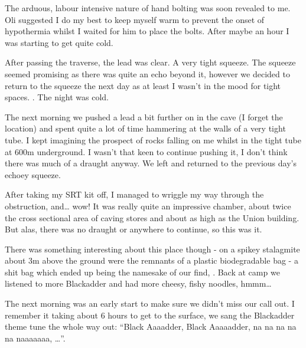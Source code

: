 The arduous, labour intensive nature of hand bolting was soon revealed to me. Oli suggested I do my best to keep myself warm to prevent the onset of hypothermia whilst I waited for him to place the bolts. After maybe an hour I was starting to get quite cold. 

After passing the traverse, the lead was clear. A very tight squeeze. The squeeze seemed promising as there was quite an echo beyond it, however we decided to return to the squeeze the next day as at least I wasn’t in the mood for tight spaces. . The night was cold. 

The next morning we pushed a lead a bit further on in the cave (I forget the location) and spent quite a lot of time hammering at the walls of a very tight tube. I kept imagining the prospect of rocks falling on me whilst in the tight tube at 600m underground. I wasn’t that keen to continue pushing it, I don’t think there was much of a draught anyway. We left and returned to the previous day’s echoey squeeze. 

After taking my SRT kit off, I managed to wriggle my way through the obstruction, and… wow! It was really quite an impressive chamber, about twice the cross sectional area of caving stores and about as high as the Union building. But alas, there was no draught or anywhere to continue, so this was it. 

There was something interesting about this place though - on a spikey stalagmite about 3m above the ground were the remnants of a plastic biodegradable bag - a shit bag which ended up being the namesake of our find, . Back at camp we listened to more Blackadder and had more cheesy, fishy noodles, hmmm…

The next morning was an early start to make sure we didn’t miss our call out. I remember it taking about 6 hours to get to the surface, we sang the Blackadder theme tune the whole way out: “Black Aaaadder, Black Aaaaadder, na na na na na naaaaaaa, …”.

